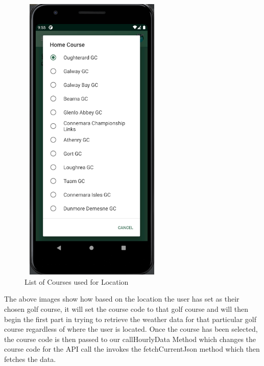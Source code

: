 \begin{figure}[H]
    \centering
    \includegraphics[width=7cm,height = 14cm]{img/InPhoneList.PNG}
    \caption{List of Courses used for Location}
    \label{fig:List of Courses used for Location}
\end{figure}
The above images show how based on the location the user has set as their chosen golf course, it will set the course code to that golf course and will then begin the first part in trying to retrieve the weather data for that particular golf course regardless of where the user is located.
\newline
Once the course has been selected, the course code is then passed to our callHourlyData Method which changes the course code for the API call the invokes the fetchCurrentJson method which then fetches the data.

